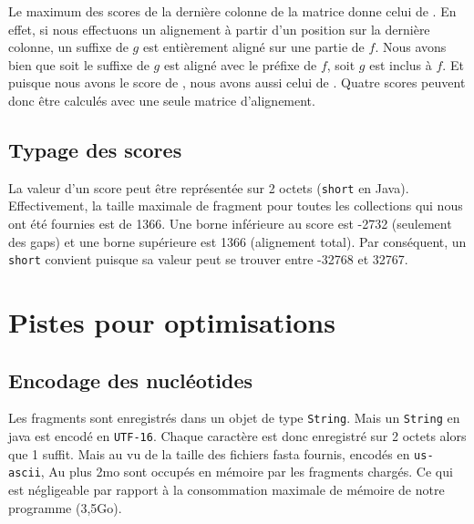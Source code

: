 Le maximum des scores de la dernière colonne de la matrice donne celui de .
En effet, si nous effectuons un alignement à partir d'un position sur la dernière colonne,
un suffixe de $g$ est entièrement aligné sur une partie de $f$.
Nous avons bien que soit le suffixe de $g$ est aligné avec le préfixe de $f$, soit $g$ est inclus à $f$.
Et puisque nous avons le score de , nous avons aussi celui de .
Quatre scores peuvent donc être calculés avec une seule matrice d'alignement.

\subsection{Typage des scores}
La valeur d'un score peut être représentée sur 2 octets (\texttt{short} en Java).
Effectivement, la taille maximale de fragment pour toutes les collections qui
nous ont été fournies est de 1366.
Une borne inférieure au score est -2732 (seulement des gaps)
et une borne supérieure est 1366 (alignement total).
Par conséquent, un \texttt{short} convient puisque sa valeur peut se trouver
entre -32768 et 32767.

\section{Pistes pour optimisations}
\subsection{Encodage des nucléotides}
Les fragments sont enregistrés dans un objet de type \texttt{String}.
Mais un \texttt{String} en java est encodé en \texttt{UTF-16}.
Chaque caractère est donc enregistré sur 2 octets alors que 1 suffit.
Mais au vu de la taille des fichiers fasta fournis, encodés en \texttt{us-ascii},
Au plus 2mo sont occupés en mémoire par les fragments chargés.
Ce qui est négligeable par rapport à la consommation maximale de mémoire de notre programme (3,5Go).